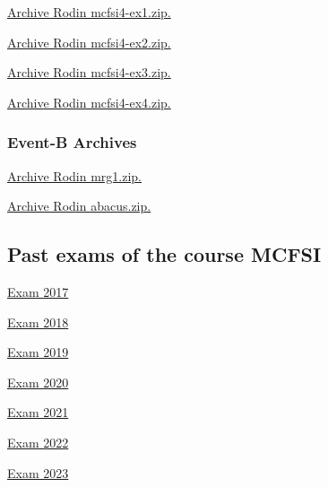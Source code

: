 \documentclass[ 12pt]{article}
\begin{document}
\href{http://mery54.github.io/teaching/mosos/models/mcfsi4-ex1.zip}{Archive 
  Rodin  mcfsi4-ex1.zip.}


\href{http://mery54.github.io/teaching/mosos/models/mcfsi4-ex2.zip}{Archive 
  Rodin  mcfsi4-ex2.zip.}





\href{http://mery54.github.io/teaching/mosos/models/mcfsi4-ex3.zip}{Archive 
  Rodin  mcfsi4-ex3.zip.}




\href{http://mery54.github.io/teaching/mosos/models/mcfsi4-ex4.zip}{Archive 
  Rodin  mcfsi4-ex4.zip.}





 \subsubsection{Event-B Archives}
\label{sec:event-b-archives}






\href{http://mery54.github.io/teaching/mosos/models/mrg1.zip}{Archive 
  Rodin  mrg1.zip.}

\href{http://mery54.github.io/teaching/mosos/models/abacus.zip}{Archive 
  Rodin  abacus.zip.}


\subsection{Past exams  of  the course MCFSI}
\label{sec:past-exams-course}


\href{http://mery54.github.io/teaching/mosos/lecturesnotes/exam2017.pdf}{Exam   2017}


\href{http://mery54.github.io/teaching/mosos/lecturesnotes/exam2018.pdf}{Exam   2018}


\href{http://mery54.github.io/teaching/mosos/lecturesnotes/exam2019.pdf}{Exam   2019}

\href{http://mery54.github.io/teaching/mosos/lecturesnotes/exam2020.pdf}{Exam   2020}

\href{http://mery54.github.io/teaching/mosos/lecturesnotes/exam2021.pdf}{Exam   2021}


\href{http://mery54.github.io/teaching/mosos/lecturesnotes/exam2022.pdf}{Exam   2022}


\href{http://mery54.github.io/teaching/mosos/lecturesnotes/exam2023.pdf}{Exam 
  2023}


\hrulefill
\end{document}
